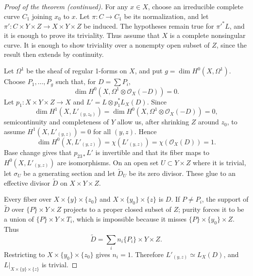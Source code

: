 \begin{proof}[Proof of the theorem (continued)]
For any $x\in X$, choose an irreducible complete curve $C_1$ joining $x_0$ to
$x$. Let $\pi:C\to C_1$ be its normalization, and let
\(\pi':C\times Y\times Z\to X\times Y\times Z\) be induced. The hypotheses
remain true for \(\pi'^*L\), and it is enough to prove its triviality. Thus
assume that \(X\) is a complete nonsingular curve. It is enough to show
triviality over a nonempty open subset of \(Z\), since the result then extends
by continuity.

Let \(\Omega^1\) be the sheaf of regular 1-forms on \(X\), and put
\(g=\dim H^0(X,\Omega^1)\). Choose \(P_1,\ldots,P_g\) such that, for
\(D=\sum P_i\),
\[
\dim H^0(X,\Omega^1\otimes\mathcal O_X(-D))=0.
\]
Let \(p_1:X\times Y\times Z\to X\) and
\(L'=L\otimes p_1^*L_X(D)\). Since
\[
\dim H^1(X,L'_{(y,z_0)})
=\dim H^0(X,\Omega^1\otimes\mathcal O_X(-D))=0,
\]
semicontinuity and completeness of \(Y\) allow us, after shrinking \(Z\) around
\(z_0\), to assume \(H^1(X,L'_{(y,z)})=0\) for all \((y,z)\). Hence
\[
\dim H^0(X,L'_{(y,z)})=\chi(L'_{(y,z)})
=\chi(\mathcal O_X(D))=1.
\]
Base change gives that \(p_{23*}L'\) is invertible and that its fiber maps to
\(H^0(X,L'_{(y,z)})\) are isomorphisms. On an open set \(U\subset Y\times Z\)
where it is trivial, let \(\sigma_U\) be a generating section and let
\(\widetilde D_U\) be its zero divisor. These glue to an effective divisor
\(\widetilde D\) on \(X\times Y\times Z\).

Every fiber over \(X\times\{y\}\times\{z_0\}\) and
\(X\times\{y_0\}\times\{z\}\) is \(D\). If \(P\ne P_i\), the support of
\(\widetilde D\) over \(\{P\}\times Y\times Z\) projects to a proper closed
subset of \(Z\); purity forces it to be a union of
\(\{P\}\times Y\times T_i\), which is impossible because it misses
\(\{P\}\times\{y_0\}\times Z\). Thus
\[
\widetilde D=\sum_i n_i\{P_i\}\times Y\times Z.
\]
Restricting to \(X\times\{y_0\}\times\{z_0\}\) gives \(n_i=1\). Therefore
\(L'_{(y,z)}\simeq L_X(D)\), and \(L|_{X\times\{y\}\times\{z\}}\) is trivial.
\end{proof}
